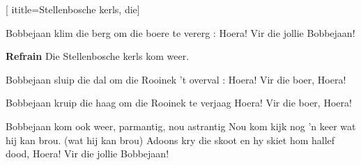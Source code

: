  [
ititle={Stellenbosche kerls, die}]

\beginverse
{}
Bobbejaan klim die berg om die boere te vererg :
Hoera! Vir die jollie Bobbejaan!
\endverse

\beginchorus
\textbf{Refrain}
{Die Stellenbosche kerls kom weer.}
\endchorus

\beginverse
{}
Bobbejaan sluip die dal om die Rooinek 't overval :
Hoera! Vir die boer, Hoera!
\endverse

\beginverse
{}
Bobbejaan kruip die haag om die Rooinek te verjaag
Hoera! Vir die boer, Hoera!
\endverse

\beginverse
Bobbejaan kom ook weer, parmantig, nou astrantig
Nou kom kijk nog 'n keer wat hij kan brou. (wat hij kan brou)
Adoons kry die skoot en hy skiet hom hallef dood,
Hoera! Vir die jollie Bobbejaan!
\endverse
\endsong
